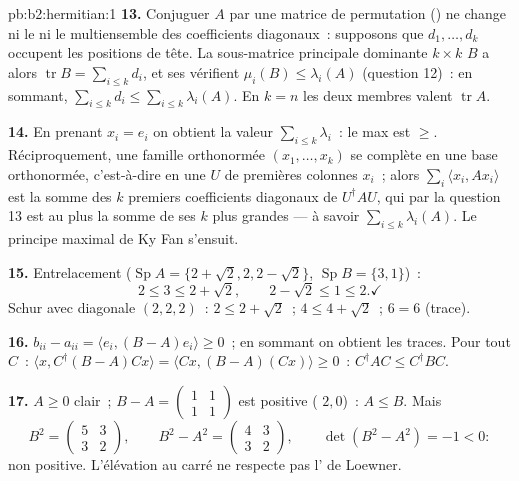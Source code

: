 \begin{solution}{pb:b2:hermitian:1}
\textbf{13.} Conjuguer $A$ par une matrice de permutation ()
ne change ni le  ni le multiensemble des coefficients
diagonaux~: supposons que $d_1, \dots, d_k$ occupent les positions
de tête. La sous-matrice principale dominante $k\times k$ $B$ a alors
$\operatorname{tr} B = \sum_{i\leq k}d_i$, et ses 
vérifient $\mu_i(B) \leq \lambda_i(A)$ (question 12)~: en sommant,
$\sum_{i\leq k}d_i \leq \sum_{i\leq k}\lambda_i(A)$. En $k =
n$ les deux membres valent $\operatorname{tr} A$.

\textbf{14.} En prenant $x_i = e_i$ on obtient la valeur
$\sum_{i\leq k}\lambda_i$~: le max est $\geq$. Réciproquement, une
famille orthonormée $(x_1, \dots, x_k)$ se complète en une
base orthonormée, c'est-à-dire en une  $U$ de premières colonnes
$x_i$~; alors $\sum_i\langle x_i, Ax_i\rangle$ est la somme des
$k$ premiers coefficients diagonaux de $U^\dagger AU$, qui par la question
13 est au plus la somme de ses $k$ plus grandes  ---
à savoir $\sum_{i\leq k}\lambda_i(A)$. Le principe maximal de Ky
Fan s'ensuit.

\textbf{15.} Entrelacement ($\operatorname{Sp}A = \{2+\sqrt2, 2,
2-\sqrt2\}$, $\operatorname{Sp}B = \{3, 1\}$)~:
\[
2 \leq 3 \leq 2 + \sqrt2,
\qquad
2 - \sqrt2 \leq 1 \leq 2 . \checkmark
\]
Schur avec diagonale $(2,2,2)$~: $2 \leq 2+\sqrt2$~; $4 \leq 4 +
\sqrt2$~; $6 = 6$ (trace). \checkmark

\textbf{16.} $b_{ii} - a_{ii} = \langle e_i, (B-A)e_i\rangle
\geq 0$~; en sommant on obtient les traces. Pour tout $C$~: $\langle x,
C^\dagger(B - A)Cx\rangle = \langle Cx, (B-A)(Cx)\rangle \geq
0$~: $C^\dagger AC \leq C^\dagger BC$.

\textbf{17.} $A \geq 0$ clair~; $B - A = \begin{pmatrix} 1 & 1\\
1 & 1\end{pmatrix}$ est positive ( $2,
0$)~: $A \leq B$. Mais
\[
B^2 = \begin{pmatrix} 5 & 3\\ 3 & 2\end{pmatrix},
\qquad
B^2 - A^2 = \begin{pmatrix} 4 & 3\\ 3 & 2\end{pmatrix},
\qquad \det(B^2 - A^2) = -1 < 0 :
\]
non positive. L'élévation au carré ne respecte pas l' de
Loewner.


\end{solution}
